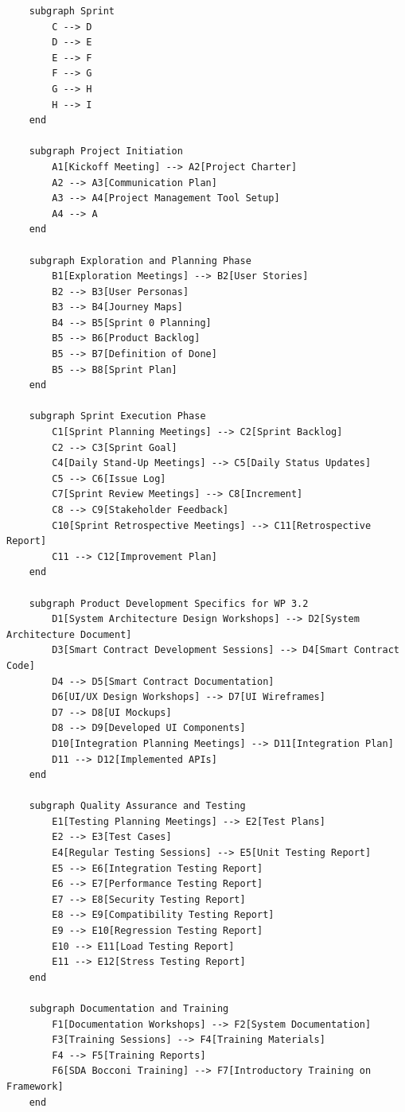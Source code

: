 \documentclass[
  letterpaper,
  DIV=11,
  numbers=noendperiod]{scrreprt}
\begin{document}
\begin{verbatim}
    subgraph Sprint
        C --> D
        D --> E
        E --> F
        F --> G
        G --> H
        H --> I
    end

    subgraph Project Initiation
        A1[Kickoff Meeting] --> A2[Project Charter]
        A2 --> A3[Communication Plan]
        A3 --> A4[Project Management Tool Setup]
        A4 --> A
    end

    subgraph Exploration and Planning Phase
        B1[Exploration Meetings] --> B2[User Stories]
        B2 --> B3[User Personas]
        B3 --> B4[Journey Maps]
        B4 --> B5[Sprint 0 Planning]
        B5 --> B6[Product Backlog]
        B5 --> B7[Definition of Done]
        B5 --> B8[Sprint Plan]
    end

    subgraph Sprint Execution Phase
        C1[Sprint Planning Meetings] --> C2[Sprint Backlog]
        C2 --> C3[Sprint Goal]
        C4[Daily Stand-Up Meetings] --> C5[Daily Status Updates]
        C5 --> C6[Issue Log]
        C7[Sprint Review Meetings] --> C8[Increment]
        C8 --> C9[Stakeholder Feedback]
        C10[Sprint Retrospective Meetings] --> C11[Retrospective Report]
        C11 --> C12[Improvement Plan]
    end

    subgraph Product Development Specifics for WP 3.2
        D1[System Architecture Design Workshops] --> D2[System Architecture Document]
        D3[Smart Contract Development Sessions] --> D4[Smart Contract Code]
        D4 --> D5[Smart Contract Documentation]
        D6[UI/UX Design Workshops] --> D7[UI Wireframes]
        D7 --> D8[UI Mockups]
        D8 --> D9[Developed UI Components]
        D10[Integration Planning Meetings] --> D11[Integration Plan]
        D11 --> D12[Implemented APIs]
    end

    subgraph Quality Assurance and Testing
        E1[Testing Planning Meetings] --> E2[Test Plans]
        E2 --> E3[Test Cases]
        E4[Regular Testing Sessions] --> E5[Unit Testing Report]
        E5 --> E6[Integration Testing Report]
        E6 --> E7[Performance Testing Report]
        E7 --> E8[Security Testing Report]
        E8 --> E9[Compatibility Testing Report]
        E9 --> E10[Regression Testing Report]
        E10 --> E11[Load Testing Report]
        E11 --> E12[Stress Testing Report]
    end

    subgraph Documentation and Training
        F1[Documentation Workshops] --> F2[System Documentation]
        F3[Training Sessions] --> F4[Training Materials]
        F4 --> F5[Training Reports]
        F6[SDA Bocconi Training] --> F7[Introductory Training on Framework]
    end


\end{verbatim}
\end{document}
